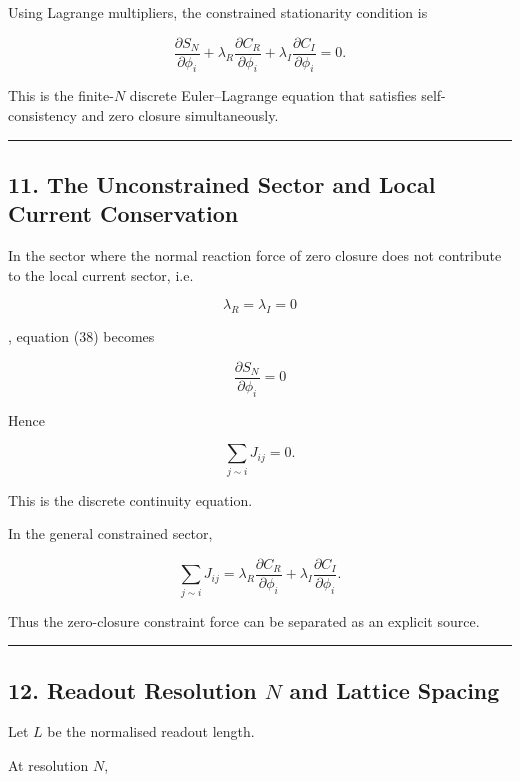 \documentclass[
  a4paper,
]{article}
\begin{document}
Using Lagrange multipliers, the constrained stationarity condition is

\[
\boxed{
\frac{\partial S_N}{\partial\phi_i}
+
\lambda_R
\frac{\partial C_R}{\partial\phi_i}
+
\lambda_I
\frac{\partial C_I}{\partial\phi_i}
=
0.
}
\tag{38}
\]

This is the finite-\(N\) discrete Euler--Lagrange equation that
satisfies self-consistency and zero closure simultaneously.

\begin{center}\rule{0.5\linewidth}{0.5pt}\end{center}

\subsection{11. The Unconstrained Sector and Local Current
Conservation}\label{the-unconstrained-sector-and-local-current-conservation}

In the sector where the normal reaction force of zero closure does not
contribute to the local current sector, i.e.

\[
\lambda_R=\lambda_I=0
\]

, equation (38) becomes

\[
\frac{\partial S_N}{\partial\phi_i}=0
\]

Hence

\[
\boxed{
\sum_{j\sim i}J_{ij}=0.
}
\tag{39}
\]

This is the discrete continuity equation.

In the general constrained sector,

\[
\sum_{j\sim i}J_{ij}
=
\lambda_R
\frac{\partial C_R}{\partial\phi_i}
+
\lambda_I
\frac{\partial C_I}{\partial\phi_i}.
\tag{40}
\]

Thus the zero-closure constraint force can be separated as an explicit
source.

\begin{center}\rule{0.5\linewidth}{0.5pt}\end{center}

\subsection{\texorpdfstring{12. Readout Resolution \(N\) and Lattice
Spacing}{12. Readout Resolution N and Lattice Spacing}}\label{readout-resolution-n-and-lattice-spacing}

Let \(L\) be the normalised readout length.

At resolution \(N\),
\end{document}
